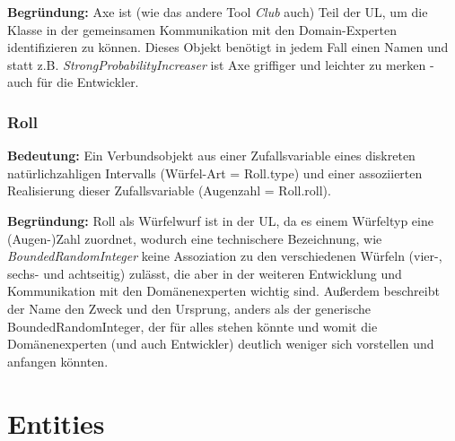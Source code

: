 \textbf{Begründung:} Axe ist (wie das andere Tool \textit{Club} auch) Teil der UL, um die Klasse in der gemeinsamen Kommunikation mit den 
Domain-Experten identifizieren zu können. Dieses Objekt benötigt in jedem Fall einen Namen und statt z.B. \textit{StrongProbabilityIncreaser}
ist Axe griffiger und leichter zu merken - auch für die Entwickler. 


\subsubsection{Roll}

\textbf{Bedeutung:} Ein Verbundsobjekt aus einer Zufallsvariable eines diskreten natürlichzahligen Intervalls 
(Würfel-Art = Roll.type) und einer assoziierten Realisierung dieser Zufallsvariable (Augenzahl = Roll.roll).

\textbf{Begründung:} Roll als Würfelwurf ist in der UL, da es einem Würfeltyp eine (Augen-)Zahl zuordnet, wodurch eine technischere Bezeichnung, 
wie \textit{BoundedRandomInteger} keine Assoziation zu den verschiedenen Würfeln (vier-, sechs- und achtseitig) zulässt, 
die aber in der weiteren Entwicklung und Kommunikation mit den Domänenexperten wichtig sind. Außerdem beschreibt der Name den Zweck und 
den Ursprung, anders als der generische BoundedRandomInteger, der für alles stehen könnte und womit die Domänenexperten (und auch Entwickler)
deutlich weniger sich vorstellen und anfangen könnten.  


\section{Entities} \label{sec:entities}

